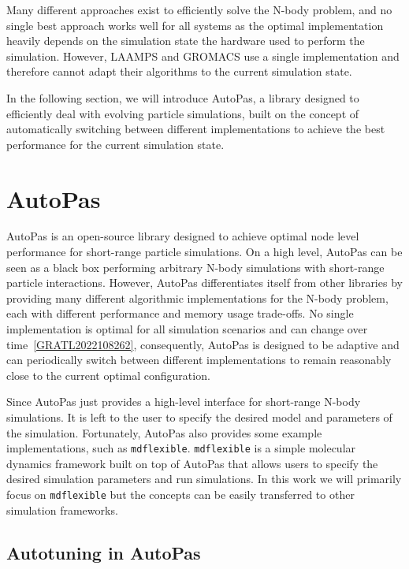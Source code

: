 Many different approaches exist to efficiently solve the N-body problem, and no single best approach works well for all systems as the optimal implementation heavily depends on the simulation state the hardware used to perform the simulation. However, LAAMPS and GROMACS use a single implementation and therefore cannot adapt their algorithms to the current simulation state.

In the following section, we will introduce AutoPas, a library designed to efficiently deal with evolving particle simulations, built on the concept of automatically switching between different implementations to achieve the best performance for the current simulation state.

\section{AutoPas}

AutoPas is an open-source library designed to achieve optimal node level performance for short-range particle simulations. On a high level, AutoPas can be seen as a black box performing arbitrary N-body simulations with short-range particle interactions. However, AutoPas differentiates itself from other libraries by providing many different algorithmic implementations for the N-body problem, each with different performance and memory usage trade-offs. No single implementation is optimal for all simulation scenarios and can change over time~\autoref{GRATL2022108262}, consequently, AutoPas is designed to be adaptive and can periodically switch between different implementations to remain reasonably close to the current optimal configuration.

Since AutoPas just provides a high-level interface for short-range N-body simulations. It is left to the user to specify the desired model and parameters of the simulation. Fortunately, AutoPas also provides some example implementations, such as \texttt{\gls{mdflexible}}. \texttt{\gls{mdflexible}} is a simple molecular dynamics framework built on top of AutoPas that allows users to specify the desired simulation parameters and run simulations. In this work we will primarily focus on \texttt{\gls{mdflexible}} but the concepts can be easily transferred to other simulation frameworks.

\subsection{Autotuning in AutoPas}

